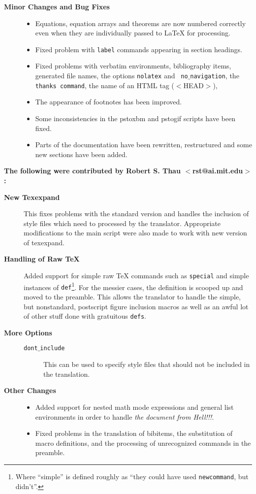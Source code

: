 \begin{description}
\item [{\bf Minor Changes and Bug Fixes}] \hfill
\begin{itemize}
\item Equations, equation arrays and theorems are now numbered
correctly even when they are individually passed to LaTeX for
processing.
\item Fixed problem with {\tt label} commands appearing in section
headings.
\item Fixed problems with verbatim environments, bibliography items,
generated file names, the options {\tt nolatex} and {\tt
no$\_$navigation}, the {\tt thanks command}, the name of an HTML tag
($<$HEAD$>$), 
\item The appearance of footnotes has been improved.
\item Some inconsistencies in the {\fn pstoxbm} and {\fn pstogif}
 scripts have been fixed.  
\item Parts of the documentation have been rewritten, restructured and
some new sections have been added. 
\end{itemize}
\end{description}

{\bf The following were contributed by Robert S. Thau
$<$rst@ai.mit.edu$>$:}

\begin{description}
\item [{\bf New Texexpand}]
This fixes problems with the standard version and 
handles the inclusion of style files which need to processed by the 
translator. Appropriate modifications to the main script were also 
made to work with new version of {\fn texexpand}. 

\item [{\bf Handling of Raw \TeX}]
Added support for simple raw TeX commands such as  
{\tt special} and simple instances of {\tt def}\footnote{Where
``simple'' is defined roughly 
as ``they could have used {\tt newcommand}, but didn't''.}. 
For the messier cases, 
the definition is scooped up and moved to the preamble.  This allows 
the translator to handle the simple, but nonstandard, postscript figure inclusion
macros as well as an awful lot of other stuff done with gratuitous 
{\tt defs}.
\item [{\bf More Options}] \hfill
\begin{description}
\item [{\tt dont$\_$include}]
This can be used  to specify style files that
should not be included in the translation.
\end{description}
\item [{\bf Other Changes}] \hfill
\begin{itemize} 
\item Added support for nested math mode expressions and general
list environments in order to handle {\em the document from Hell!!!}.
\item Fixed problems in the translation of 
bibitems, the substitution of macro definitions, and the processing of
unrecognized commands in the preamble.
\end{itemize}
\end{description}
